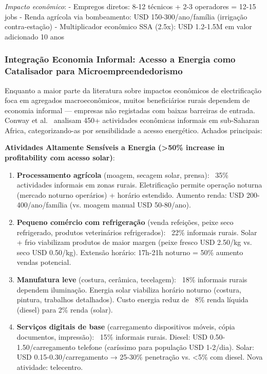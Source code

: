 \documentclass[12pt, a4paper]{article}
\begin{document}
\textit{Impacto econômico}:
- Empregos diretos: 8-12 técnicos + 2-3 operadores = 12-15 jobs
- Renda agrícola via bombeamento: USD 150-300/ano/família (irrigação contra-estação)
- Multiplicador econômico SSA (2.5x): USD 1.2-1.5M em valor adicionado 10 anos

\subsubsection{Integração Economia Informal: Acesso a Energia como Catalisador para Microempreendedorismo}

Enquanto a maior parte da literatura sobre impactos econômicos de electrificação foca em agregados macroeconômicos, muitos beneficiários rurais dependem de economia informal — empresas não registadas com baixas barreiras de entrada. Conway et al.~\citep{Conway2019} analisam 450+ actividades econômicas informais em sub-Saharan Africa, categorizando-as por sensibilidade a acesso energético. Achados principais:

\textbf{Atividades Altamente Sensíveis a Energia (>50\% increase in profitability com acesso solar)}:
\begin{enumerate}
\item \textbf{Processamento agrícola} (moagem, secagem solar, prensa): ~35\% actividades informais em zonas rurais. Eletrificação permite operação noturna (mercado noturno operários) + horário estendido. Aumento renda: USD 200-400/ano/família (vs. moagem manual USD 50-80/ano).
\item \textbf{Pequeno comércio com refrigeração} (venda refeições, peixe seco refrigerado, produtos veterinários refrigerados): ~22\% informais rurais. Solar + frio viabilizam produtos de maior margen (peixe fresco USD 2.50/kg vs. seco USD 0.50/kg). Extensão horário: 17h-21h noturno = 50\% aumento vendas potencial.
\item \textbf{Manufatura leve} (costura, cerâmica, tecelagem): ~18\% informais rurais dependem iluminação. Energia solar viabiliza horário noturno (costura, pintura, trabalhos detalhados). Custo energia reduz de ~8\% renda líquida (diesel) para 2\% renda (solar).
\item \textbf{Serviços digitais de base} (carregamento dispositivos móveis, cópia documentos, impressão): ~15\% informais rurais. Diesel: USD 0.50-1.50/carregamento telefone (caríssimo para população USD 1-2/dia). Solar: USD 0.15-0.30/carregamento → 25-30\% penetração vs. <5\% com diesel. Nova atividade: telecentro.
\end{enumerate}
\end{document}
